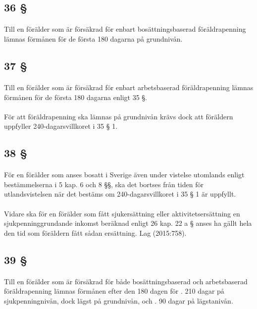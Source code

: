 \documentclass[a4paper,notitlepage,openany,10pt]{book}
\begin{document}
\subsection*{36 §}
\paragraph*{}
Till en förälder som är försäkrad för enbart bosättningsbaserad föräldrapenning lämnas förmånen för de första 180 dagarna på grundnivån.
\subsection*{37 §}
\paragraph*{}
Till en förälder som är försäkrad för enbart arbetsbaserad föräldrapenning lämnas förmånen för de första 180 dagarna enligt 35 §.
\paragraph*{}
För att föräldrapenning ska lämnas på grundnivån krävs dock att föräldern uppfyller 240-dagarsvillkoret i 35 § 1.
\subsection*{38 §}
\paragraph*{}
För en förälder som anses bosatt i Sverige även under vistelse utomlands enligt bestämmelserna i 5 kap. 6 och 8 §§, ska det bortses från tiden för utlandsvistelsen när det bestäms om 240-dagarsvillkoret i 35 § 1 är uppfyllt.
\paragraph*{}
Vidare ska för en förälder som fått sjukersättning eller aktivitetsersättning en sjukpenninggrundande inkomst beräknad enligt 26 kap. 22 a § anses ha gällt hela den tid som föräldern fått sådan ersättning.
Lag (2015:758).
\subsection*{39 §}
\paragraph*{}
Till en förälder som är försäkrad för både bosättningsbaserad och arbetsbaserad föräldrapenning lämnas förmånen efter den 180 dagen för
. 210 dagar på sjukpenningnivån, dock lägst på grundnivån, och
. 90 dagar på lägstanivån.
\end{document}
